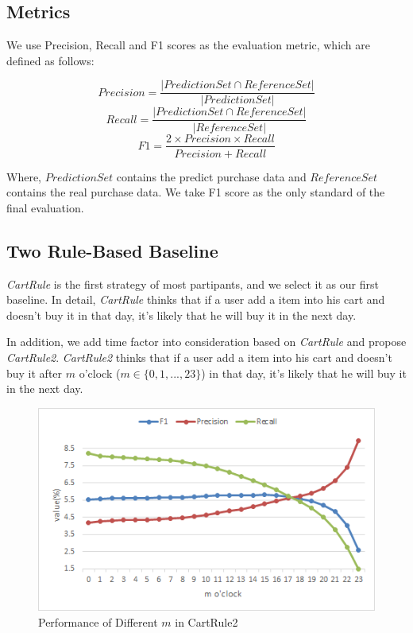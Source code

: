 \documentclass{llncs}
\begin{document}
\subsection{Metrics}
We use Precision, Recall and F1 scores as the evaluation metric, which are defined as follows:

$$ Precision = \frac{ \left| PredictionSet \cap ReferenceSet \right| }{ \left| PredictionSet \right| } $$
$$ Recall = \frac{ \left| PredictionSet \cap ReferenceSet \right| }{ \left| ReferenceSet \right| } $$
$$ F1 = \frac{ 2 \times Precision \times Recall }{ Precision + Recall } $$

Where, $PredictionSet$ contains the predict purchase data and $ReferenceSet$ contains the real purchase data.
We take F1 score as the only standard of the final evaluation.

\subsection{Two Rule-Based Baseline}
\emph{CartRule} is the first strategy of most partipants, and we select it as our first baseline.
In detail, \emph{CartRule} thinks that if a user add a item into his cart and doesn't buy it in that day,
it's likely that he will buy it in the next day.

In addition, we add time factor into consideration based on \emph{CartRule}
and propose \emph{CartRule2}.
\emph{CartRule2} thinks that if a user add a item into his cart and doesn't buy it
after $m$ o'clock ($ m \in \{ 0, 1, ..., 23 \} $) in that day,
it's likely that he will buy it in the next day.

\begin{figure}[htbp]
	\centering
	\includegraphics[scale=0.6]{images/rule.png}
	\caption{Performance of Different $m$ in CartRule2}
	\label{fig:rule}
\end{figure}
\end{document}
